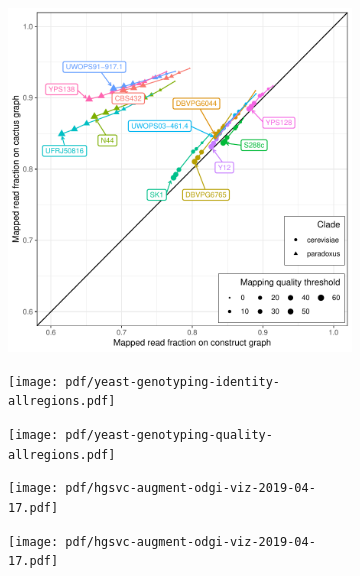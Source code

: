 \documentclass{article}
\begin{document}
\begin{figure}
\begin{subfigure}[b]{.5\textwidth}
    \includegraphics[width=\textwidth]{pdf/yeast-mapping-quality-all.pdf}
  \end{subfigure}
\end{figure}

\clearpage
\begin{figure}
  \begin{subfigure}[b]{.5\textwidth}
    \caption{}
    \texttt{[image: pdf/yeast-genotyping-identity-allregions.pdf]}
  \end{subfigure}
  \begin{subfigure}[b]{.5\textwidth}
    \caption{}
    \texttt{[image: pdf/yeast-genotyping-quality-allregions.pdf]}
  \end{subfigure}
\end{figure}

\clearpage
\begin{figure}
  \begin{subfigure}[b]{\textwidth}
    \caption{}
    \texttt{[image: pdf/hgsvc-augment-odgi-viz-2019-04-17.pdf]}
  \end{subfigure}
  \begin{subfigure}[b]{\textwidth}
    \caption{}
    \texttt{[image: pdf/hgsvc-augment-odgi-viz-2019-04-17.pdf]}
  \end{subfigure}
\end{figure}
\end{document}
